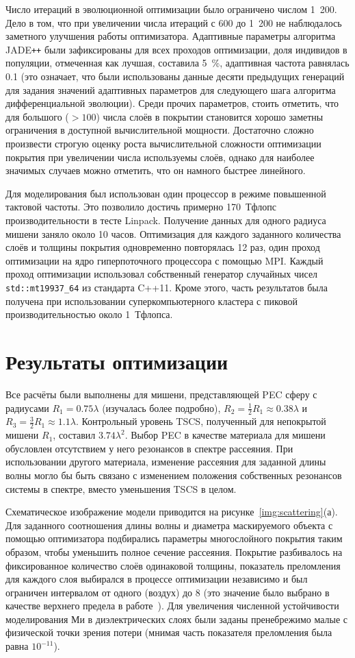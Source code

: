 Число итераций в эволюционной оптимизации было ограничено числом
1~200. Дело в том, что при увеличении числа итераций с 600 до 1~200 не
наблюдалось заметного улучшения работы оптимизатора. Адаптивные
параметры алгоритма JADE\texttt{++} были зафиксированы для всех проходов
оптимизации, доля индивидов в популяции, отмеченная как лучшая,
составила 5~\%, адаптивная частота равнялась 0.1 (это означает, что
были использованы данные десяти предыдущих генераций для задания
значений адаптивных параметров для следующего шага алгоритма
дифференциальной эволюции).  Среди прочих параметров, стоить отметить,
что для большого ($>100$) числа слоёв в покрытии становится хорошо
заметны ограничения в доступной вычислительной мощности. Достаточно
сложно произвести строгую оценку роста вычислительной сложности
оптимизации покрытия при увеличении числа используемы слоёв, однако
для наиболее значимых случаев можно отметить, что он намного быстрее
линейного.

Для моделирования был использован один процессор в режиме повышенной
тактовой частоты. Это позволило достичь примерно 170~Тфлопс
производительности в тесте Linpack. Получение данных для одного
радиуса мишени заняло около 10 часов. Оптимизация для каждого
заданного количества слоёв и толщины покрытия одновременно повторялась
12 раз, один проход оптимизации на ядро гиперпоточного процессора с
помощью MPI. Каждый проход оптимизации использовал собственный
генератор случайных чисел \verb+std::mt19937_64+ из стандарта
C++11. Кроме этого, часть результатов была получена при использовании
суперкомпьютерного кластера с пиковой производительностью около
1~Тфлопса.

\section{Результаты оптимизации}  
Все расчёты были выполнены для мишени, представляющей PEC сферу с
радиусами ${R_1 = 0.75\lambda}$ (изучалась более подробно),
${R_2 = \frac{1}{2}R_1\approx 0.38\lambda}$ и
${R_3 = \frac{3}{2}R_1 \approx 1.1\lambda}$.  Контрольный уровень
TSCS, полученный для непокрытой мишени ${R_1}$, составил
$3.74\lambda^2$.  Выбор PEC в качестве материала для мишени обусловлен
отсутствием у него резонансов в спектре рассеяния. При использовании
другого материала, изменение рассеяния для заданной длины волны могло
бы быть связано с изменением положения собственных резонансов системы
в спектре, вместо уменьшения TSCS в целом.

Схематическое изображение модели приводится на
рисунке~\ref{img:scattering}(а). Для заданного соотношения длины волны
и диаметра маскируемого объекта с помощью оптимизатора подбирались
параметры многослойного покрытия таким образом, чтобы уменьшить полное
сечение рассеяния.  Покрытие разбивалось на фиксированное количество
слоёв одинаковой толщины, показатель преломления для каждого слоя
выбирался в процессе оптимизации независимо и был ограничен интервалом
от одного (воздух) до $8$ (это значение было выбрано в качестве
верхнего предела в работе~\cite{semouchkina2}).  Для увеличения
численной устойчивости моделирования Ми в диэлектрических слоях были
заданы пренебрежимо малые с физической точки зрения потери (мнимая
часть показателя преломления была равна $10^{-11}$).

